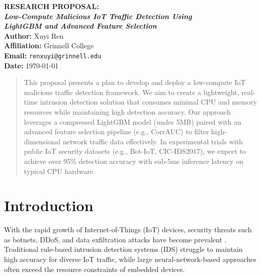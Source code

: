 \documentclass[12pt]{article}
\begin{document}

\begin{titlepage}
    \centering
    \vspace*{3cm}
    {\Large \textbf{RESEARCH PROPOSAL:\\[6pt]
    \textit{Low-Compute Malicious IoT Traffic Detection Using \\ LightGBM and Advanced Feature Selection}}}\\
    \vfill
    \textbf{Author:} Xuyi Ren \\
    \textbf{Affiliation:} Grinnell College \\
    \textbf{Email:} \texttt{renxuyi@grinnell.edu} \\
    \vfill
    \textbf{Date:} \today
    \vspace*{2cm}
\end{titlepage}


\begin{abstract}
This proposal presents a plan to develop and deploy a low-compute IoT malicious traffic detection framework. 
We aim to create a lightweight, real-time intrusion detection solution that consumes minimal CPU and memory resources while maintaining high detection accuracy. 
Our approach leverages a compressed LightGBM model (under 5MB) paired with an advanced feature selection pipeline (e.g., CorrAUC) to filter high-dimensional network traffic data effectively. 
In experimental trials with public IoT security datasets (e.g., Bot-IoT, CIC-IDS2017), we expect to achieve over 95\% detection accuracy with sub-5ms inference latency on typical CPU hardware. 
\end{abstract}

\newpage


\section{Introduction}

With the rapid growth of Internet-of-Things (IoT) devices, security threats such as botnets, DDoS, and data exfiltration attacks have become prevalent \cite{salman2022iot}. 
Traditional rule-based intrusion detection systems (IDS) struggle to maintain high accuracy for diverse IoT traffic, while large neural-network-based approaches often exceed the resource constraints of embedded devices.
\end{document}

